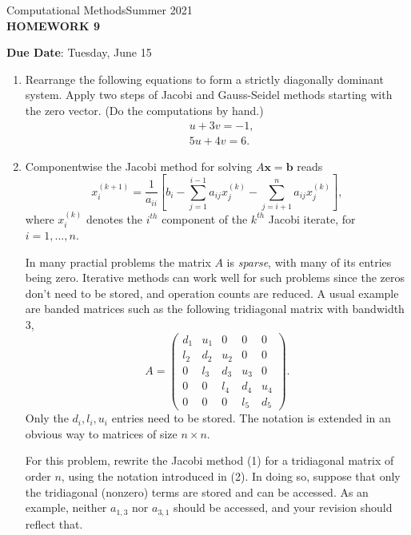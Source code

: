 \documentclass[12pt]{article}
\begin{document}
\begin{center}
Computational Methods\qquad Summer 2021
\\

\textbf{\large HOMEWORK 9}\\
\end{center}
\noindent \textbf{Due Date}: Tuesday, June 15\\

\begin{enumerate}
\item Rearrange the following equations to form a strictly diagonally dominant system. Apply two steps of Jacobi and Gauss-Seidel methods starting with the zero vector. (Do the computations by hand.)
	\begin{equation*}\begin{aligned}
	& u+3v=-1,\\ 
	& 5u+4v=6.
	\end{aligned}\end{equation*}
\item Componentwise the Jacobi method for solving $A\textbf{x}=\textbf{b}$ reads
	\begin{equation}x_{i}^{(k+1)}=\frac{1}{a_{ii}}\left[b_i -\sum_{j=1}^{i-1}a_{ij}x_j^{(k)}-\sum_{j=i+1}^n a_{ij}x_j^{(k)}\right],\end{equation}
where $x_i^{(k)}$ denotes the $i^{th}$ component of the $k^{th}$ Jacobi iterate, for $i=1,...,n$.

In many practial problems the matrix $A$ is \emph{sparse}, with many of its entries being zero. Iterative methods can work well for such problems since the zeros don't need to be stored, and operation counts are reduced. A usual example are banded matrices such as the following tridiagonal matrix with bandwidth 3,
	\begin{equation}A=\begin{pmatrix}
	d_1&u_1&0&0&0\\
	l_2&d_2&u_2&0&0\\
	0&l_3&d_3&u_3&0\\
	0&0&l_4&d_4&u_4\\
	0&0&0&l_5&d_5\end{pmatrix}.\end{equation}
Only the $d_i, l_i, u_i$ entries need to be stored. The notation is extended in an obvious way to matrices of size $n\times n$.

For this problem, rewrite the Jacobi method (1) for a tridiagonal matrix of order $n$, using the notation introduced in (2). In doing so, suppose that only the tridiagonal (nonzero) terms are stored and can be accessed. As an  example, neither $a_{1,3}$ nor $a_{3,1}$ should be accessed, and your revision should reflect that.


\end{enumerate}
\end{document}
